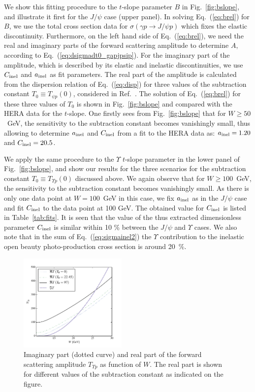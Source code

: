 \documentclass[prd,amsmath,%
twocolumn,floatfix,amssymb, preprintnumbers, nofootinbib, superscriptaddress]{revtex4}
\begin{document}
We show this fitting procedure to the $t$-slope parameter $B$ in Fig.~\ref{fig:bslope}, and illustrate it first for the $J/\psi$ case (upper panel). In solving Eq.~(\ref{eq:brel}) for $B$, 
we use the total cross section data for 
$\sigma(\gamma p \to J/\psi p)$ which fixes the elastic discontinuity. Furthermore, on the left hand side of Eq.~(\ref{eq:brel}), we need the real and imaginary parts of the forward scattering amplitude to determine $A$, according to Eq.~(\ref{eq:dsigmadt0_gapjpsip}). 
For the imaginary part of the amplitude, which is described by its elastic and inelastic discontinuities, we use $C_{\rm inel}$ and $a_{\rm inel}$ as fit parameters.   
The real part of the amplitude is calculated from the dispersion relation of Eq.~(\ref{eq:disp}) for three values of the subtraction constant $T_0 \equiv T_{\psi p}(0)$, considered in Ref.~\cite{Gryniuk:2016mpk}. The solution of Eq.~(\ref{eq:brel}) for these three values of $T_0$ is shown in Fig.~\ref{fig:bslope} and compared with the HERA data for the $t$-slope. One firstly sees from Fig.~\ref{fig:bslope} that for $W \geq 50$~GeV, the sensitivity to the subtraction constant becomes vanishingly small, thus allowing to determine $a_{\rm inel}$ and $C_{\rm inel}$ from a fit to the HERA data as: $a_{\rm inel} = 1.20$ and 
$C_{\rm inel} = 20.5$. 


We apply the same procedure to the $\Upsilon$ $t$-slope parameter in the lower panel of Fig.~\ref{fig:bslope}, and  show our results for the three scenarios for the subtraction constant $T_0 \equiv T_{\Upsilon p}(0)$ discussed above. We again observe that for $W \geq 100$~GeV, the sensitivity to the subtraction constant becomes vanishingly small. 
As there is only one data point at $W = 100$~GeV in this case, we fix $a_{\rm inel}$ as in the $J/\psi$ case and fit $C_{\rm inel}$ to the data point at 100 GeV. The obtained value for $C_{\rm inel}$ is listed in Table~\ref{tab:fits}. It is seen that the value of the thus extracted dimensionless parameter $C_{\rm inel}$ is similar within 10 \% between the $J/\psi$ and $\Upsilon$ cases. We also note that in the sum of Eq.~(\ref{eq:sigmainel2}) the $\Upsilon$ contribution  to the inelastic open beauty photo-production cross section is around 20~\%. 

\begin{figure}
\includegraphics[width=0.47\textwidth]{t_y.pdf}
\caption{
Imaginary part (dotted curve) and real part of the forward scattering amplitude $T_{\Upsilon p}$ as function of $W$.
The real part is shown for different values of the subtraction constant as indicated on the figure.
}
\label{fig:psip_psip}
\end{figure}
\end{document}
